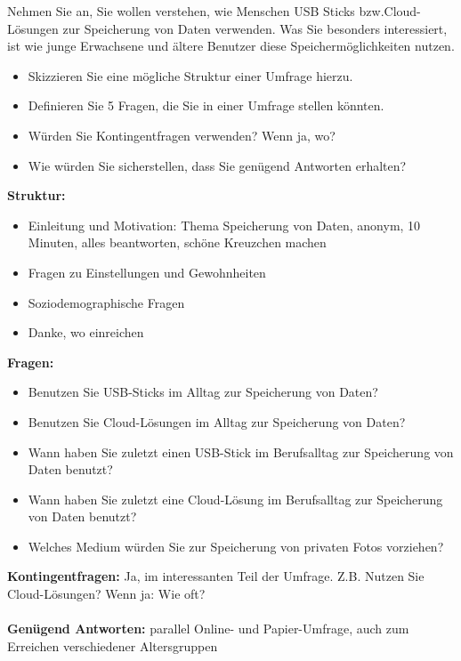 \begin{exercise}
  Nehmen Sie an, Sie wollen verstehen, wie Menschen USB Sticks bzw.Cloud-Lösungen zur Speicherung von Daten verwenden. 
  Was Sie besonders interessiert, ist wie junge Erwachsene und ältere Benutzer diese Speichermöglichkeiten nutzen.
  \begin{itemize}
    \item Skizzieren Sie eine mögliche Struktur einer Umfrage hierzu.
    \item Definieren Sie 5 Fragen, die Sie in einer Umfrage stellen könnten.
    \item Würden Sie Kontingentfragen verwenden? Wenn ja, wo?
    \item Wie würden Sie sicherstellen, dass Sie genügend Antworten erhalten?
  \end{itemize}
  \vspace{0.5cm}
\end{exercise}
\textbf{Struktur:}
\begin{itemize}
  \item Einleitung und Motivation: Thema Speicherung von Daten, anonym, 10 Minuten, alles beantworten, schöne Kreuzchen machen
  \item Fragen zu Einstellungen und Gewohnheiten
  \item Soziodemographische Fragen
  \item Danke, wo einreichen
\end{itemize}

\textbf{Fragen:}
\begin{itemize}
  \item Benutzen Sie USB-Sticks im Alltag zur Speicherung von Daten?
  \item Benutzen Sie Cloud-Lösungen im Alltag zur Speicherung von Daten?
  \item Wann haben Sie zuletzt einen USB-Stick im Berufsalltag zur Speicherung von Daten benutzt?
  \item Wann haben Sie zuletzt eine Cloud-Lösung im Berufsalltag zur Speicherung von Daten benutzt?
  \item Welches Medium würden Sie zur Speicherung von privaten Fotos vorziehen?
\end{itemize}
\textbf{Kontingentfragen:} Ja, im interessanten Teil der Umfrage. Z.B. Nutzen Sie Cloud-Lösungen? Wenn ja: Wie oft?
\\\\
\textbf{Genügend Antworten:} parallel Online- und Papier-Umfrage, auch zum Erreichen verschiedener Altersgruppen
